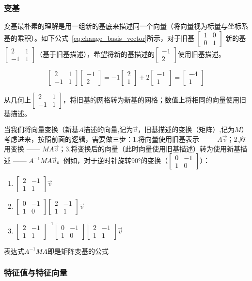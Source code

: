 \documentclass[UTF8]{ctexart}
\newcommand{\mat}[1]{\begin{bmatrix} #1 \end{bmatrix}}
\begin{document}
\subsubsection{变基}

变基最朴素的理解是用一组新的基底来描述同一个向量（将向量视为标量与坐标系基的乘积）。如下公式~\ref{eq:change_basis_vector}所示，对于旧基 $\mat{1&0\\0&1}$ 新的基  $\mat{2&1\\-1&1}$（基于旧基描述），希望将新的基描述的$\mat{-1\\2}$使用旧基描述。

\begin{equation}
    \label{eq:change_basis_vector}
    \mat{2&1\\-1&1}\mat{-1\\2} = -1\mat{2\\1}+2\mat{-1\\1} = \mat{-4\\1}
\end{equation}

从几何上$\mat{2&1\\-1&1}$，将旧基的网格转为新基的网格；数值上将相同的向量使用旧基描述。

当我们将向量变换（新基$A$描述的向量,记为$\vec{v}$，旧基描述的变换（矩阵）,记为$M$）考虑进来，按照前面的逻辑，需要做三步：1.将向量使用旧基表示 —— $A\vec{v}$；2.应用变换 —— $MA\vec{v}$；3.将变换后的向量（此时向量使用旧基描述）转为使用新基描述  —— $A^{-1}MA\vec{v}$。例如，对于逆时针旋转90°的变换（$\mat{0&-1\\1&0}$）：

\begin{enumerate}
    \item $\mat{2&-1\\1&1}\vec{v}$
    \item $\mat{0&-1\\1&0}\mat{2&-1\\1&1}\vec{v}$
    \item $\mat{2&-1\\1&1}^{-1}\mat{0&-1\\1&0}\mat{2&-1\\1&1}\vec{v}$
\end{enumerate}

表达式$A^{-1}MA$即是矩阵变基的公式

\subsubsection{特征值与特征向量}
\end{document}
